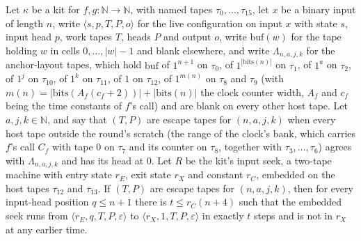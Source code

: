 \begin{theorem}
\label{Turing.NTimeDiag.qy_seek_run}
\leanok
{}
Let $\kappa$ be a kit for $f, g : \mathbb{N} \to \mathbb{N}$, with named tapes $\tau_0, \dots,
\tau_{15}$, let $x$ be a binary input of length $n$, write $\langle s, p, T, P, o\rangle$ for the
live configuration on input $x$ with state $s$, input head $p$, work tapes $T$, heads $P$ and
output $o$, write $\mathrm{buf}(w)$ for the tape holding $w$ in cells $0, \dots, |w| - 1$ and blank
elsewhere, and write $\Lambda_{n,a,j,k}$ for the anchor-layout tapes, which hold $\mathrm{buf}$ of
$1^{n+1}$ on $\tau_0$, of $1^{|\mathrm{bits}(n)|}$ on $\tau_1$, of $1^a$ on $\tau_2$, of $1^j$ on
$\tau_{10}$, of $1^k$ on $\tau_{11}$, of $1$ on $\tau_{12}$, of $1^{m(n)}$ on $\tau_8$ and $\tau_9$
(with $m(n) = |\mathrm{bits}(A_f(c_f + 2))| + |\mathrm{bits}(n)|$ the clock counter width, $A_f$
and $c_f$ being the time constants of $f$'s call) and are blank on every other host tape. Let $a,
j, k \in \mathbb{N}$, and say that $(T, P)$ are escape tapes for $(n, a, j, k)$ when every host
tape outside the round's scratch (the range of the clock's bank, which carries $f$'s call $C_f$
with tape $0$ on $\tau_7$ and its counter on $\tau_8$, together with $\tau_3, \dots, \tau_6$)
agrees with $\Lambda_{n,a,j,k}$ and has its head at $0$. Let $R$ be the kit's input seek, a
two-tape machine with entry state $r_E$, exit state $r_X$ and constant $r_C$, embedded on the host
tapes $\tau_{12}$ and $\tau_{13}$. If $(T, P)$ are escape tapes for $(n, a, j, k)$, then for every
input-head position $q \le n + 1$ there is $t \le r_C(n + 4)$ such that the embedded seek runs from
$\langle r_E, q, T, P, \varepsilon \rangle$ to $\langle r_X, 1, T, P, \varepsilon\rangle$ in
exactly $t$ steps and is not in $r_X$ at any earlier time.
\end{theorem}

